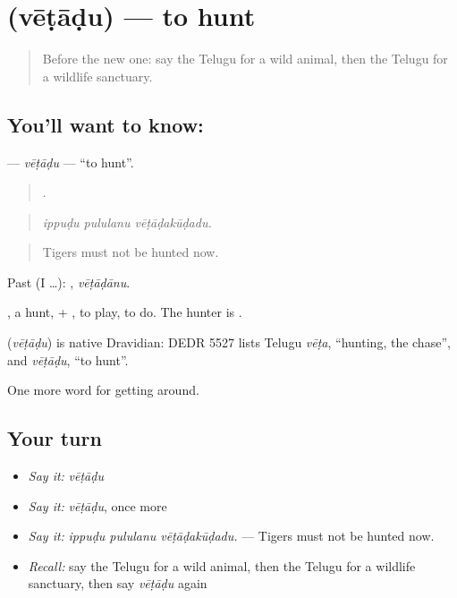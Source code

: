 \section[\texorpdfstring{\te{వేటాడు} (vēṭāḍu)}{వేటాడు (vēṭāḍu)}]{ (vēṭāḍu) — to hunt}

\label{lesson:TE-C472-vetadu}



\begin{quote}
Before the new one: say the Telugu for a wild animal, then the Telugu for a wildlife sanctuary.
\end{quote}

\subsection*{You'll want to know: }
\textbf{} — \emph{vēṭāḍu} — \textquotedblleft{}to hunt\textquotedblright{}.

\begin{quote}
  .
\end{quote}

\begin{quote}
\emph{ippuḍu pululanu vēṭāḍakūḍadu.}
\end{quote}

\begin{quote}
Tigers must not be hunted now.
\end{quote}

Past (I …): , \emph{vēṭāḍānu}.

, a hunt, + , to play, to do. The hunter is .

\begin{cousinweb}
\textbf{} (\emph{vēṭāḍu}) is native Dravidian: DEDR 5527 lists Telugu \emph{vēṭa}, \textquotedblleft{}hunting, the chase\textquotedblright{}, and \emph{vēṭāḍu}, \textquotedblleft{}to hunt\textquotedblright{}.
\end{cousinweb}

\begin{grammarlens}[title={What you've built}]
One more word for getting around.
\end{grammarlens}

\subsection*{Your turn}
\begin{itemize}
\raggedright
  \item \emph{Say it:} \emph{vēṭāḍu}
  \item \emph{Say it:} \emph{vēṭāḍu}, once more
  \item \emph{Say it:} \emph{ippuḍu pululanu vēṭāḍakūḍadu.} — Tigers must not be hunted now.
  \item \emph{Recall:} say the Telugu for a wild animal, then the Telugu for a wildlife sanctuary, then say \emph{vēṭāḍu} again
\end{itemize}

